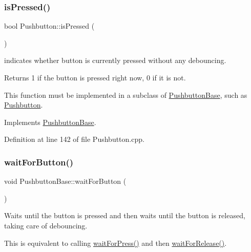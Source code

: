 \subsubsection{\texorpdfstring{is\+Pressed()}{isPressed()}}
{\footnotesize\ttfamily bool Pushbutton\+::is\+Pressed (\begin{DoxyParamCaption}{ }\end{DoxyParamCaption})\hspace{0.3cm}{\ttfamily [virtual]}}



indicates whether button is currently pressed without any debouncing. 

\begin{DoxyReturn}{Returns}
1 if the button is pressed right now, 0 if it is not.
\end{DoxyReturn}
This function must be implemented in a subclass of \hyperlink{class_pushbutton_base}{Pushbutton\+Base}, such as \hyperlink{class_pushbutton}{Pushbutton}. 

Implements \hyperlink{class_pushbutton_base_a5b11851f15413140b75e4574e773b6ae}{Pushbutton\+Base}.



Definition at line 142 of file Pushbutton.\+cpp.

\mbox{\label{class_pushbutton_base_ab755065c930be0649597220316213e8a}} 
\subsubsection{\texorpdfstring{wait\+For\+Button()}{waitForButton()}}
{\footnotesize\ttfamily void Pushbutton\+Base\+::wait\+For\+Button (\begin{DoxyParamCaption}{ }\end{DoxyParamCaption})\hspace{0.3cm}{\ttfamily [inherited]}}



Waits until the button is pressed and then waits until the button is released, taking care of debouncing. 

This is equivalent to calling \hyperlink{class_pushbutton_base_a2e2787595c82ee0913ecf4c1eea4a2c8}{wait\+For\+Press()} and then \hyperlink{class_pushbutton_base_ae5fff34b3e1ebd62fd02b99edd6bf13a}{wait\+For\+Release()}. 

